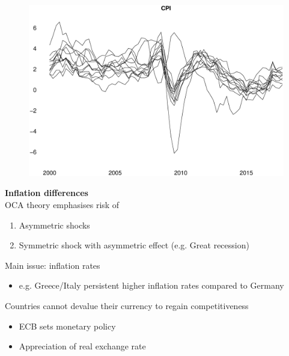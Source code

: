 \documentclass{beamer}
\begin{document}
\begin{frame}
  \begin{figure}
    \includegraphics[scale=.3]{inflation_eurozone2.eps}
  \end{figure}
\end{frame}

\begin{frame}
  \textbf{Inflation differences}\\
  OCA theory emphasises risk of 
  \begin{enumerate}
    \item Asymmetric shocks
    \item Symmetric shock with asymmetric effect (e.g. Great recession)
  \end{enumerate}
  \medskip
  Main issue: inflation rates
  \begin{itemize}
    \item e.g. Greece/Italy persistent higher inflation rates compared to Germany
  \end{itemize}
  \medskip
  Countries cannot devalue their currency to regain competitiveness 
  \begin{itemize}
    \item ECB sets monetary policy
    \item Appreciation of real exchange rate
  \end{itemize}  
\end{frame}
\end{document}

